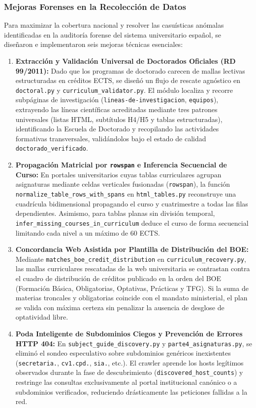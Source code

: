 \subsubsection{Mejoras Forenses en la Recolección de Datos}
Para maximizar la cobertura nacional y resolver las casuísticas anómalas identificadas en la auditoría forense del sistema universitario español, se diseñaron e implementaron seis mejoras técnicas esenciales:
\begin{enumerate}
    \item \textbf{Extracción y Validación Universal de Doctorados Oficiales (RD 99/2011):} Dado que los programas de doctorado carecen de mallas lectivas estructuradas en créditos ECTS, se diseñó un flujo de rescate agnóstico en \texttt{doctoral.py} y \texttt{curriculum\_validator.py}. El módulo localiza y recorre subpáginas de investigación (\texttt{lineas-de-investigacion}, \texttt{equipos}), extrayendo las líneas científicas acreditadas mediante tres patrones universales (listas HTML, subtítulos H4/H5 y tablas estructuradas), identificando la Escuela de Doctorado y recopilando las actividades formativas transversales, validándolos bajo el estado de calidad \texttt{doctorado\_verificado}.
    \item \textbf{Propagación Matricial por \texttt{rowspan} e Inferencia Secuencial de Curso:} En portales universitarios cuyas tablas curriculares agrupan asignaturas mediante celdas verticales fusionadas (\texttt{rowspan}), la función \texttt{normalize\_table\_rows\_with\_spans} en \texttt{html\_tables.py} reconstruye una cuadrícula bidimensional propagando el curso y cuatrimestre a todas las filas dependientes. Asimismo, para tablas planas sin división temporal, \texttt{infer\_missing\_courses\_in\_curriculum} deduce el curso de forma secuencial limitando cada nivel a un máximo de 60 ECTS.
    \item \textbf{Concordancia Web Asistida por Plantilla de Distribución del BOE:} Mediante \texttt{matches\_boe\_credit\_distribution} en \texttt{curriculum\_recovery.py}, las mallas curriculares rescatadas de la web universitaria se contrastan contra el cuadro de distribución de créditos publicado en la orden del BOE (Formación Básica, Obligatorias, Optativas, Prácticas y TFG). Si la suma de materias troncales y obligatorias coincide con el mandato ministerial, el plan se valida con máxima certeza sin penalizar la ausencia de desglose de optatividad libre.
    \item \textbf{Poda Inteligente de Subdominios Ciegos y Prevención de Errores HTTP 404:} En \texttt{subject\_guide\_discovery.py} y \texttt{parte4\_asignaturas.py}, se eliminó el sondeo especulativo sobre subdominios genéricos inexistentes (\texttt{secretaria.}, \texttt{cv1.cpd.}, \texttt{sia.}, etc.). El crawler aprende los hosts legítimos observados durante la fase de descubrimiento (\texttt{discovered\_host\_counts}) y restringe las consultas exclusivamente al portal institucional canónico o a subdominios verificados, reduciendo drásticamente las peticiones fallidas a la red.

\end{enumerate}
